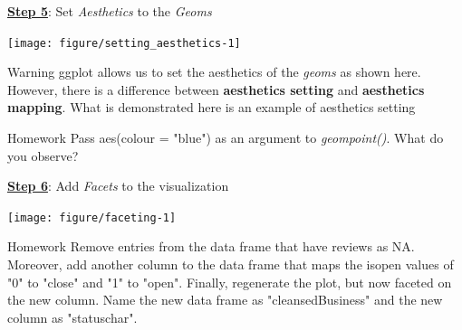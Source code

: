 \documentclass[12pt]{book}\usepackage{knitr}
\begin{document}
\newpage
\noindent \textbf{\Large \underline{Step 5}}: {\Large Set \emph{Aesthetics} to the \emph{Geoms}} 
\begin{knitrout}
\color{fgcolor}\begin{kframe}
\begin{alltt}
 \hlkwb{<-}  \hlopt{+} \hlstd{(} \hlstd{=} \hlstd{)}
\end{alltt}
\end{kframe}
\texttt{[image: figure/setting\_aesthetics-1]} 

\end{knitrout}

\begin{DIY}{Warning}
\noindent  ggplot allows us to set the aesthetics of the \emph{geoms} as shown here. However, there is a difference between \textbf{aesthetics setting} and \textbf{aesthetics mapping}. What is demonstrated here is an example of aesthetics setting
\end{DIY}

\begin{DIY}{Homework}
\noindent  Pass aes(colour = "blue") as an argument to \emph{geom\textunderscore point()}. What do you observe?
\end{DIY}

\newpage
\noindent \textbf{\Large \underline{Step 6}}: {\Large Add \emph{Facets} to the visualization}
\begin{knitrout}
\color{fgcolor}\begin{kframe}
\begin{alltt}
 \hlopt{+} \hlopt{$} \hlopt{~} 
\end{alltt}
\end{kframe}
\texttt{[image: figure/faceting-1]} 
\begin{kframe}\begin{alltt}
\end{alltt}
\end{kframe}
\end{knitrout}


\begin{DIY}{Homework}
\noindent Remove entries from the data frame that have reviews as NA. Moreover, add another column to the data frame that maps the is\textunderscore open values of "0" to "close" and "1" to "open". 
Finally, regenerate the plot, but now faceted on the new column. Name the new data frame as "cleansedBusiness" and the new column as "status\textunderscore char". 
\end{DIY}
\end{document}
